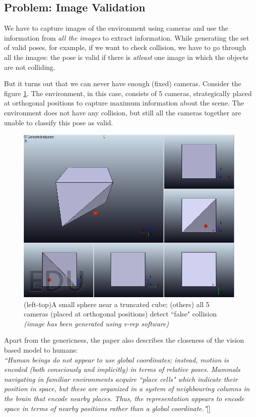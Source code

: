 \documentclass[12pt]{article}
\begin{document}
\subsection{Problem: Image Validation}
We have to capture images of the environment using cameras and use the information from \textit{all the images} to extract information. While generating the set of valid poses, for example, if we want to check collision, we have to go through all the images: the pose is valid if there is \textit{atleast} one image in which the objects are not colliding.

But it turns out that we can never have enough (fixed) cameras. Consider the figure \ref{difficulties}. The environment, in this case, consists of 5 cameras, strategically placed at orthogonal positions to capture maximum information about the scene. The environment does not have any collision, but still all the cameras together are unable to classify this pose as valid.\\
\begin{figure}
  \includegraphics[width=\columnwidth]{difficulties}
  \caption{(left-top)A small sphere near a truncated cube; (others) all 5 cameras (placed at orthogonal positions) detect ``false" collision \textit{\small{(image has been generated using v-rep software)}}}
  \label{difficulties}
\end{figure}

Apart from the genericness, the paper also describes the closeness of the vision based model to humans:\\
\textit{``Human beings do not appear to use global coordinates; instead, motion is encoded (both consciously and implicitly) in terms of relative poses. Mammals navigating in familiar environments acquire ``place cells" which indicate their position in space, but these are organized in a system of neighbouring columns in the brain that encode nearby places. Thus, the representation appears to encode space in terms of nearby positions rather than a global coordinate."}[\cite{deb}]
\end{document}
